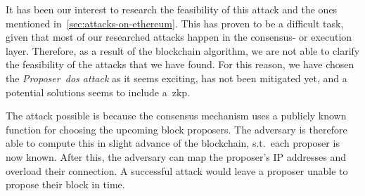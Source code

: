 It has been our interest to research the feasibility of this attack and the ones mentioned in~\autoref{sec:attacks-on-ethereum}.
This has proven to be a difficult task, given that most of our researched attacks happen in the consensus- or execution layer.
Therefore, as a result of the blockchain algorithm, we are not able to clarify the feasibility of the attacks that we have found.
For this reason, we have chosen the \textit{Proposer~\gls{dos} attack} as it seems exciting, has not been mitigated yet, and a potential solutions seems to include a~\gls{zkp}.

The attack possible is because the consensus mechanism uses a publicly known function for choosing the upcoming block proposers.
The adversary is therefore able to compute this in slight advance of the blockchain, s.t.\ each proposer is now known.
After this, the adversary can map the proposer's IP addresses and overload their connection.
A successful attack would leave a proposer unable to propose their block in time.